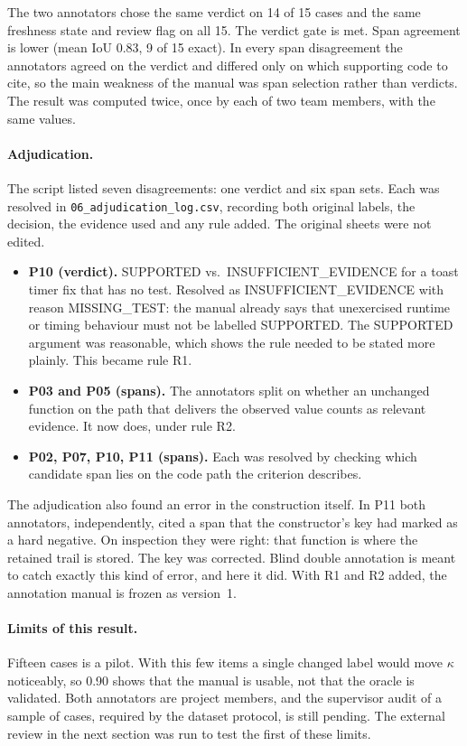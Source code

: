 The two annotators chose the same verdict on 14 of 15 cases and the same
freshness state and review flag on all 15. The verdict gate is met. Span
agreement is lower (mean IoU 0.83, 9 of 15 exact). In every span disagreement the
annotators agreed on the verdict and differed only on which supporting code to
cite, so the main weakness of the manual was span selection rather than verdicts.
The result was computed twice, once by each of two team members, with the same
values.

\paragraph{Adjudication.} The script listed seven disagreements: one verdict and
six span sets. Each was resolved in \texttt{06\_\allowbreak{}adjudication\_\allowbreak{}log.\allowbreak{}csv}, recording
both original labels, the decision, the evidence used and any rule added. The
original sheets were not edited.
\begin{itemize}
  \item \textbf{P10 (verdict).} SUPPORTED vs.\ INSUFFICIENT\_EVIDENCE for a toast
        timer fix that has no test. Resolved as INSUFFICIENT\_EVIDENCE with
        reason MISSING\_TEST: the manual already says that unexercised runtime
        or timing behaviour must not be labelled SUPPORTED. The SUPPORTED
        argument was reasonable, which shows the rule needed to be stated more
        plainly. This became rule R1.
  \item \textbf{P03 and P05 (spans).} The annotators split on whether an
        unchanged function on the path that delivers the observed value counts
        as relevant evidence. It now does, under rule R2.
  \item \textbf{P02, P07, P10, P11 (spans).} Each was resolved by checking which
        candidate span lies on the code path the criterion describes.
\end{itemize}
The adjudication also found an error in the construction itself. In P11 both
annotators, independently, cited a span that the constructor's key had marked as
a hard negative. On inspection they were right: that function is where the
retained trail is stored. The key was corrected. Blind double annotation is meant
to catch exactly this kind of error, and here it did. With R1 and R2 added, the
annotation manual is frozen as version~1.

\paragraph{Limits of this result.} Fifteen cases is a pilot. With this few items
a single changed label would move $\kappa$ noticeably, so 0.90 shows that the
manual is usable, not that the oracle is validated. Both annotators are project
members, and the supervisor audit of a sample of cases, required by the dataset
protocol, is still pending. The external review in the next section was run to
test the first of these limits.

